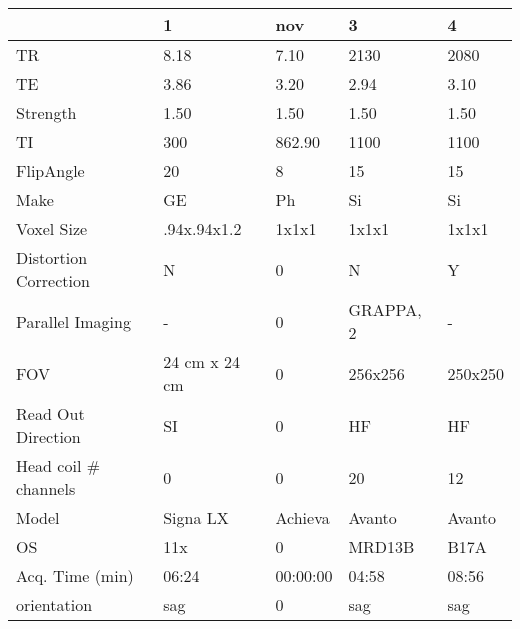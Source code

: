 \begin{table}
[]
\centering
\begin{tabular}{lllll}
\toprule
{} & 1 & nov & 3 & 4 \\
\midrule
TR                    &               8.18 &               7.10 &                 2130 &                 2080 \\
TE                    &               3.86 &               3.20 &                 2.94 &                 3.10 \\
Strength              &               1.50 &               1.50 &                 1.50 &                 1.50 \\
TI                    &                300 &             862.90 &                 1100 &                 1100 \\
FlipAngle             &                 20 &                  8 &                   15 &                   15 \\
Make                  &                 GE &                 Ph &                   Si &                   Si \\
Voxel Size            &        .94x.94x1.2 &              1x1x1 &                1x1x1 &                1x1x1 \\
Distortion Correction &                  N &                  0 &                    N &                    Y \\
Parallel Imaging      &                  - &                  0 &            GRAPPA, 2 &                    - \\
FOV                   &      24 cm x 24 cm &                  0 &              256x256 &              250x250 \\
Read Out Direction    &                 SI &                  0 &                   HF &                   HF \\
Head coil \# channels  &                  0 &                  0 &                   20 &                   12 \\
Model                 &           Signa LX &            Achieva &               Avanto &               Avanto \\
OS                    &                11x &                  0 &               MRD13B &                 B17A \\
Acq. Time (min)       &           06:24 &           00:00:00 &             04:58 &             08:56 \\
orientation           &                sag &                  0 &                  sag &                  sag \\

\end{tabular}
\end{table}
